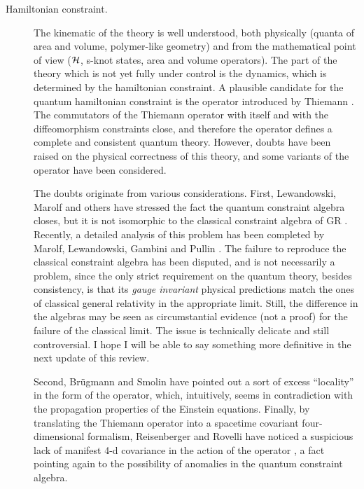 \begin{description}

\item[Hamiltonian constraint.] 

The kinematic of the theory is well understood, both physically 
(quanta of area and volume, polymer-like geometry) and from the 
mathematical point of view ($\cal H$, s-knot states, area and 
volume operators).  The part of the theory which is not yet fully 
under control is the dynamics, which is determined by the 
hamiltonian constraint.  A plausible candidate for the quantum 
hamiltonian constraint is the operator introduced by Thiemann 
\cite{Thiemann96,Thiemann96b,Thiemann96c}.  The commutators of 
the Thiemann operator with itself and with the diffeomorphism 
constraints close, and therefore the operator defines a complete 
and consistent quantum theory.  However, doubts have been raised 
on the physical correctness of this theory, and some variants of 
the operator have been considered.

The doubts originate from various considerations.  First, Lewandowski, 
Marolf and others have stressed the fact the quantum constraint 
algebra closes, but it is not isomorphic to the classical constraint 
algebra of GR \cite{LewandowskiMarolf}.  Recently, a detailed analysis 
of this problem has been completed by Marolf, Lewandowski, Gambini and 
Pullin \cite{LewandowskiEtAl}.  The failure to reproduce the classical 
constraint algebra has been disputed, and is not necessarily a 
problem, since the only strict requirement on the quantum theory, 
besides consistency, is that its {\em gauge invariant\/} physical 
predictions match the ones of classical general relativity in the 
appropriate limit.  Still, the difference in the algebras may be seen as 
circumstantial evidence (not a proof) for the failure of the classical 
limit.  The issue is technically delicate and still 
controversial.  I hope I will be able to say something more 
definitive in the next update of this review. 

Second, Br\"ugmann \cite{Bruegmann3} and Smolin \cite{Smolin96} 
have pointed out a sort of excess ``locality'' in the form of the 
operator, which, intuitively, seems in contradiction with the 
propagation properties of the Einstein equations.  Finally, by 
translating the Thiemann operator into a spacetime covariant 
four-dimensional formalism, Reisenberger and Rovelli have noticed 
a suspicious lack of manifest 4-d covariance in the action of the 
operator \cite{ReisenbergerRovelli}, a fact pointing again to the 
possibility of anomalies in the quantum constraint algebra.


\end{description}
